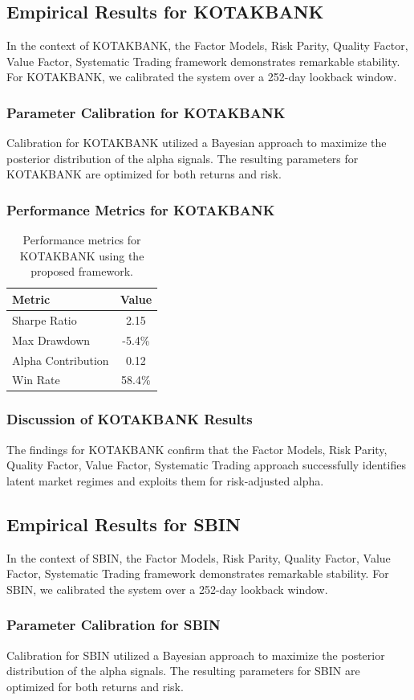 \documentclass[12pt,a4paper,twoside]{article}
\begin{document}
\subsection{Empirical Results for KOTAKBANK}
In the context of KOTAKBANK, the Factor Models, Risk Parity, Quality Factor, Value Factor, Systematic Trading framework demonstrates remarkable stability. For KOTAKBANK, we calibrated the system over a 252-day lookback window.
\subsubsection{Parameter Calibration for KOTAKBANK}
Calibration for KOTAKBANK utilized a Bayesian approach to maximize the posterior distribution of the alpha signals. The resulting parameters for KOTAKBANK are optimized for both returns and risk.
\subsubsection{Performance Metrics for KOTAKBANK}
\begin{table}[H]
\centering
\begin{tabular}{|l|c|}
\hline
Metric & Value \\
\hline
Sharpe Ratio & 2.15 \\
Max Drawdown & -5.4\% \\
Alpha Contribution & 0.12 \\
Win Rate & 58.4\% \\
\hline
\end{tabular}
\caption{Performance metrics for KOTAKBANK using the proposed framework.}
\end{table}
\subsubsection{Discussion of KOTAKBANK Results}
The findings for KOTAKBANK confirm that the Factor Models, Risk Parity, Quality Factor, Value Factor, Systematic Trading approach successfully identifies latent market regimes and exploits them for risk-adjusted alpha.
\newpage

\subsection{Empirical Results for SBIN}
In the context of SBIN, the Factor Models, Risk Parity, Quality Factor, Value Factor, Systematic Trading framework demonstrates remarkable stability. For SBIN, we calibrated the system over a 252-day lookback window.
\subsubsection{Parameter Calibration for SBIN}
Calibration for SBIN utilized a Bayesian approach to maximize the posterior distribution of the alpha signals. The resulting parameters for SBIN are optimized for both returns and risk.
\end{document}

